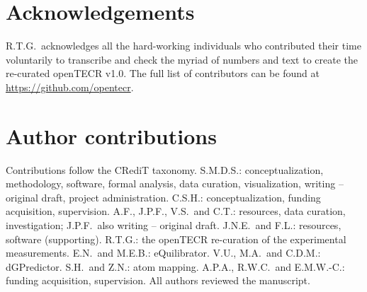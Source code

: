 \documentclass[unnumsec,webpdf,modern,large]{oup-authoring-template}
\begin{document}
\section{Acknowledgements} R.T.G.\ acknowledges all the hard-working individuals who contributed their time voluntarily to transcribe and check the myriad of numbers and text to create the re-curated openTECR v1.0. The full list of contributors can be found at \url{https://github.com/opentecr}.

\section{Author contributions} Contributions follow the CRediT taxonomy. S.M.D.S.: conceptualization, methodology, software, formal analysis, data curation, visualization, writing -- original draft, project administration. C.S.H.: conceptualization, funding acquisition, supervision. A.F., J.P.F., V.S.\ and C.T.: resources, data curation, investigation; J.P.F.\ also writing -- original draft. J.N.E.\ and F.L.: resources, software (supporting). R.T.G.: the openTECR re-curation of the experimental measurements. E.N.\ and M.E.B.: eQuilibrator. V.U., M.A.\ and C.D.M.: dGPredictor. S.H.\ and Z.N.: atom mapping. A.P.A., R.W.C.\ and E.M.W.-C.: funding acquisition, supervision. All authors reviewed the manuscript.
\end{document}

